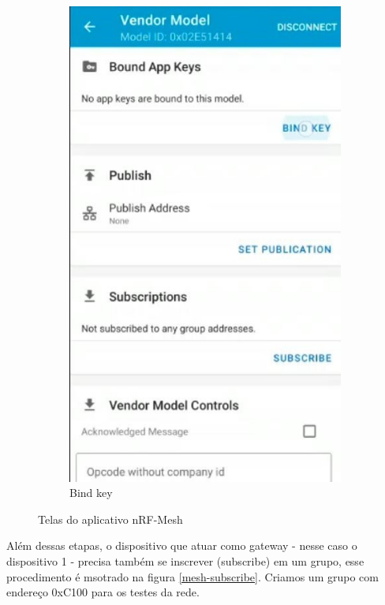 \documentclass[../monografia.tex]{subfiles}
\begin{document}
\begin{figure}[h]
\begin{subfigure}[b]{0.22\textwidth}
		\includegraphics[width=\textwidth]{mesh-bind-4}
		\caption{Bind key}
		\label{fig:mesh-bind-4}
	\end{subfigure}
	\caption{Telas do aplicativo nRF-Mesh}
	\label{fig:app-nrf-mesh}
\end{figure}

\newpage
Além dessas etapas, o dispositivo que atuar como gateway - nesse caso o dispositivo 1 - precisa também se inscrever (subscribe) em um grupo, esse procedimento é msotrado na figura \ref{mesh-subscribe}. Criamos um grupo com endereço 0xC100 para os testes da rede. 
\end{document}
